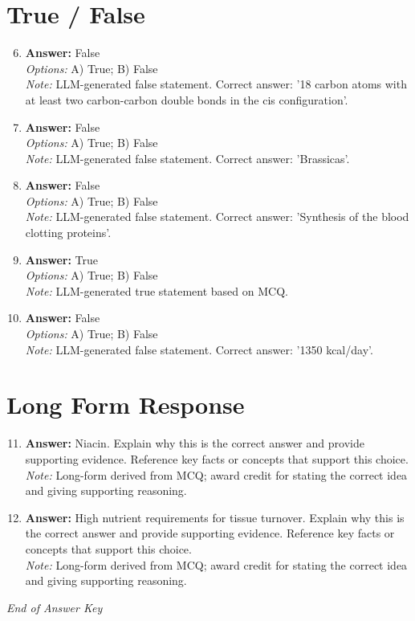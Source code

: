 \documentclass[12pt]{article}
\begin{document}
\section*{True / False}
\begin{enumerate}[label=\arabic*.]
\setcounter{enumi}{5}
\item \textbf{Answer:} False
\\ \textit{Options:} A) True; B) False
\\ \textit{Note:} LLM-generated false statement. Correct answer: '18 carbon atoms with at least two carbon-carbon double bonds in the cis configuration'.
\item \textbf{Answer:} False
\\ \textit{Options:} A) True; B) False
\\ \textit{Note:} LLM-generated false statement. Correct answer: 'Brassicas'.
\item \textbf{Answer:} False
\\ \textit{Options:} A) True; B) False
\\ \textit{Note:} LLM-generated false statement. Correct answer: 'Synthesis of the blood clotting proteins'.
\item \textbf{Answer:} True
\\ \textit{Options:} A) True; B) False
\\ \textit{Note:} LLM-generated true statement based on MCQ.
\item \textbf{Answer:} False
\\ \textit{Options:} A) True; B) False
\\ \textit{Note:} LLM-generated false statement. Correct answer: '1350 kcal/day'.
\end{enumerate}

\section*{Long Form Response}
\begin{enumerate}[label=\arabic*.]
\setcounter{enumi}{10}
\item \textbf{Answer:} Niacin. Explain why this is the correct answer and provide supporting evidence. Reference key facts or concepts that support this choice.
\\ \textit{Note:} Long-form derived from MCQ; award credit for stating the correct idea and giving supporting reasoning.
\item \textbf{Answer:} High nutrient requirements for tissue turnover. Explain why this is the correct answer and provide supporting evidence. Reference key facts or concepts that support this choice.
\\ \textit{Note:} Long-form derived from MCQ; award credit for stating the correct idea and giving supporting reasoning.
\end{enumerate}

\vfill
\noindent\textit{End of Answer Key}
\end{document}

